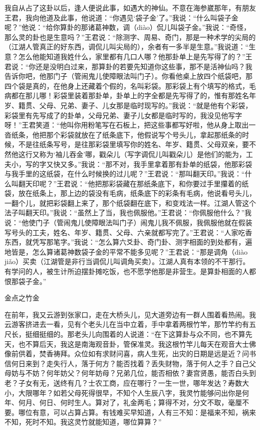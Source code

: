 \documentclass[12pt,UTF8]{ctexbook}
\begin{document}
我自从占了这卦以后，逢人便说此事，如遇大的神仙。不意在海参崴那年，有朋友王君，我向他道及此事，他说道：“你遇见‘袋子金’了。”我说：“什么叫袋子金呢？”他说：“给你算卦的那诸葛神数，调（diào）侃儿叫袋子金。”我说：“奇怪，那么灵的卦也是生意吗？”王君说：“除测字、周易、奇门，那是一种术学的尖局的（江湖人管真正的好东西，调侃儿叫尖局的），余者有一多半是生意。”我说道：“生意？怎么他能知道我姓什么，家里都有几口人哪？他那卦单上是先写得了的？”王君说：“你还是没明白过来，那算卦的若要先知道你这些事，那不是活神仙吗？我告诉你吧，他那门子（管闹鬼儿使障眼法叫门子）。你看他桌上放四个纸袋吧，那四个袋是真的，在他身上还藏着个假的，名叫彩袋。那彩袋上有个填写的格式，毛病都在那儿哪！彩袋里装着那卦单，卦单上的字全都是先写得了的，惟有那姓名年岁、籍贯、父母、兄弟、妻子、儿女那是临时现写的。”我说：“就是他有个彩袋，彩袋里有先写成了的卦单，父母兄弟、妻子儿女都是临时写的，我没见他写字呀！”王君笑道：“他叫你用粉笔写在石板上，把这些事都写好啦，他从身上取出一沓纸条，他把那个彩袋就放在了纸条底下，他假说写个号头儿，拿起那纸条的时候，不是往纸条写号，是往那彩袋里填写你的姓名、年岁、籍贯、父母双亲，要不然他这行又称为‘袖儿吞金’哪，戳朵儿（写字调侃儿叫戳朵儿）是他们的能为，工夫小，写的字又快又多。”我说：“那不对，我手里拿着那有卦单的纸袋，他那彩袋与我手里的这纸袋，在什么时候换的过儿呢？”王君说：“那叫翻天印。”我说：“什么叫翻天印呢？”王君说：“他把那彩袋藏在那纸条底下，和你要过手里攥着的纸袋，放在纸条上，那上边的袋没有毛病，纸条底下的彩条有毛病，他说看号头儿，一翻个儿，就把彩袋翻上来了，那个纸袋翻在底下，和变戏法一样。江湖人管这个法子叫翻天印。”我说：“虽然上了当，我也佩服他。”王君说：“你佩服他什么？”我说：“他使门子（管闹鬼儿使障眼法叫门子）闹鬼儿我不佩服，我佩服他就在假装写号头的工夫，姓名、年岁、籍贯、父母、六亲就都写完了。”王君说：“人家吃香东西，就凭写那笔字。”我说：“怎么算六爻卦、奇门卦、测字相面的到处都有，遍地皆是，怎么算诸葛神数袋子金的平常不能多见呢？”王君说：“那是调角（diào jiǎo）买卖（江湖管是非行当调侃儿叫调角买卖）。江湖人真有本领的不干那行。有学问的人，被生计所迫摆卦摊吃饭，也不愿学他那是非营生。是算卦相面的人都恨那袋子金。”





金点之竹金


在前年，我又云游到张家口，走在大桥头儿，见大道旁边有一群人围着看热闹。我云游客挤进去一看，见有个老头儿在当中立着，手中拿着两根竹竿，那竹竿约有五尺长，挺细挺细的。那老头儿向围着的人说道：“在下这算卦与众不同，也不算先天，也不算后天，我这是南海观音卦，管保准灵。我这根竹竿儿每天在观音大士佛像前供着，焚香祷拜。众位如有求财问喜，病人生死，出灾的日期是远是近？问书信何日来到？走失行人，落于何方？能否找着？丢失财物，落于何人之手？自己父母妨与不妨？何年妨父？何年妨母？兄弟几位，能否相依？妻宫贤愚，能否白头到老？子女有无，送终有几？士农工商，应在哪行？一生一世，哪年发达？寿数大小，大限哪年？如若父母死得很早，不知个人生辰八字，我灵竹能够问出你是何年、何月、何日、何时生人。算对了，礼金两毛；算得不对，分文不取，毫厘不要。哪位有意，可以占算占算。有钱难买早知道，人有三不知：是福来不知，祸来不知，死时不知。我这灵竹就能知道，哪位算算？”
\end{document}
